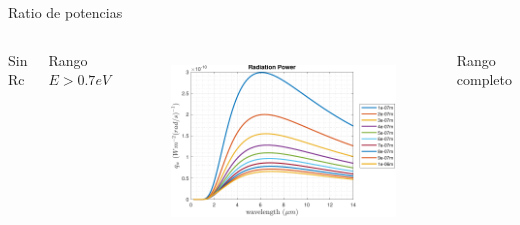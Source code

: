 \documentclass[spanish,a4paper]{beamer}%
\newcommand{\resRelPath}{\graphicspath{{./figuras/Resultados/RelacionCondRad/}}}
\begin{document}
		\begin{frame}{Ratio de potencias}
			\resRelPath
			\begin{columns}
					\vspace{-.3cm}
						\begin{block}{\centering Sin Rc}
						\end{block}
					\vspace{0pt}
					\begin{minipage}[l]{.1\columnwidth}
							\begin{turn}{90}
							\begin{minipage}[t]{80pt}
								\begin{block}{\centering Rango $E>0.7eV$}
								\end{block}
							\end{minipage}
							\end{turn}
					\end{minipage}\hfill
					\begin{minipage}[r]{.9\columnwidth}
						\begin{figure}[h]%
								\flushright
										\includegraphics[width=0.8\columnwidth]{SiGe}
								\label{fig:SiSiO2Ge_rel}%
						\end{figure}
						\end{minipage}\hfill \vfill
						\begin{minipage}[l]{.1\columnwidth}
							\begin{turn}{90}
							\begin{minipage}[t]{80pt}
								\begin{block}{\centering Rango completo}
								\end{block}
							\end{minipage}
							\end{turn}

\end{minipage}
\end{columns}
\end{frame}
\end{document}
